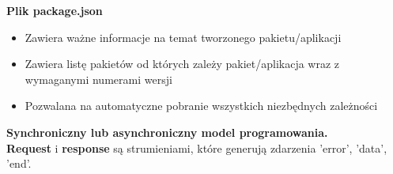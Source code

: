\documentclass[../main.tex]{subfiles}
\begin{document}
    \textbf{Plik package.json}
    \begin{itemize}
        \item Zawiera ważne informacje na temat tworzonego pakietu/aplikacji
        \item Zawiera listę pakietów od których zależy pakiet/aplikacja wraz z wymaganymi numerami wersji
        \item Pozwalana na automatyczne pobranie wszystkich niezbędnych zależności
    \end{itemize}

    \textbf{Synchroniczny lub asynchroniczny model programowania.}\\

    \textbf{Request} i \textbf{response} są strumieniami, które generują zdarzenia 'error', 'data', 'end'.
\end{document}
